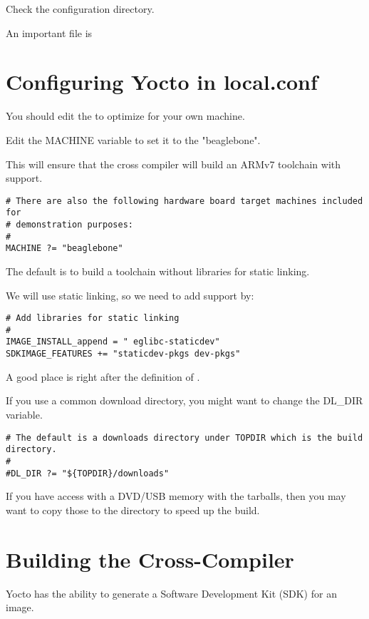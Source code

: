 Check the  configuration directory.

An important file is 

\section{Configuring Yocto in local.conf}

You should edit the  to optimize for your own machine.

Edit the MACHINE variable to set it to the "beaglebone".

This will ensure that the cross compiler will build an ARMv7 toolchain with  support.

\begin{verbatim}
# There are also the following hardware board target machines included for 
# demonstration purposes:
#
MACHINE ?= "beaglebone"
\end{verbatim}

The default is to build a toolchain without libraries for static linking.

We will use static linking, so we need to add support by:

\begin{verbatim}
# Add libraries for static linking
#
IMAGE_INSTALL_append = " eglibc-staticdev"
SDKIMAGE_FEATURES += "staticdev-pkgs dev-pkgs"
\end{verbatim}

A good place is right after the definition of .

If you use a common download directory, you might want to  change the DL\_DIR variable.

\begin{verbatim}
# The default is a downloads directory under TOPDIR which is the build directory.
#
#DL_DIR ?= "${TOPDIR}/downloads"
\end{verbatim}

If you have access with a DVD/USB memory with the tarballs, then you may
want to copy those to the  directory to speed up the build.

\clearpage
\section{Building the Cross-Compiler}

Yocto has the ability to generate a Software Development Kit (SDK) for an image.

